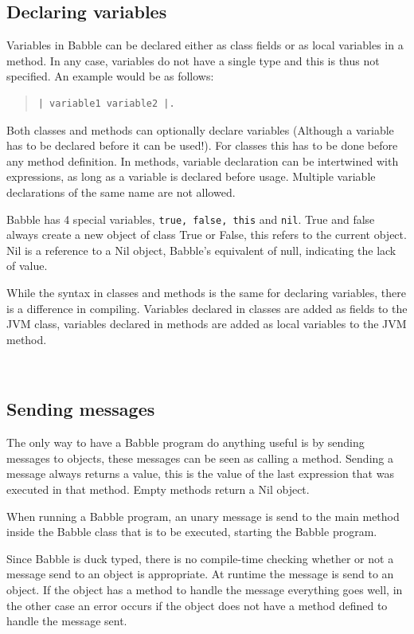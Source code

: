 \documentclass[a4paper]{article}
\begin{document}
\subsection{Declaring variables}
Variables in Babble can be declared either as class fields or as local variables in a method. In any case, variables do not have a single type and this is thus not specified. An example would be as follows:
\begin{quote}
\begin{lstlisting}
| variable1 variable2 |.
\end{lstlisting}
\end{quote}

Both classes and methods can optionally declare variables (Although a variable has to be declared before it can be used!). For classes this has to be done before any method definition. In methods, variable declaration can be intertwined with expressions, as long as a variable is declared before usage. Multiple variable declarations of the same name are not allowed.

Babble has 4 special variables, \texttt{true, false, this} and \texttt{nil}. True and false always create a new object of class True or False, this refers to the current object. Nil is a reference to a Nil object, Babble's equivalent of null, indicating the lack of value.

While the syntax in classes and methods is the same for declaring variables, there is a difference in compiling. Variables declared in classes are added as fields to the JVM class, variables declared in methods are added as local variables to the JVM method.

\

\subsection{Sending messages}

The only way to have a Babble program do anything useful is by sending messages to objects, these messages can be seen as calling a method. Sending a message always returns a value, this is the value of the last expression that was executed in that method. Empty methods return a Nil object.

When running a Babble program, an unary message is send to the main method inside the Babble class that is to be executed, starting the Babble program.

Since Babble is duck typed, there is no compile-time checking whether or not a message send to an object is appropriate. At runtime the message is send to an object. If the object has a method to handle the message everything goes well, in the other case an error occurs if the object does not have a method defined to handle the message sent.
\end{document}
